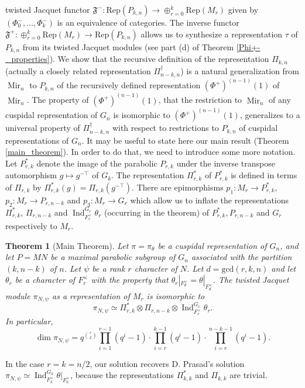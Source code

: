 \documentclass[reqno]{amsart}
\newtheorem*{theorem*}{Theorem}
\theoremstyle{definition}
\theoremstyle{remark}
\numberwithin{equation}{section}
\newcommand{\fF}{\mathfrak F}
\DeclareMathOperator{\Ind}{Ind}
\DeclareMathOperator{\Mir}{Mir}
\begin{document}
twisted Jacquet functor $\fF^-: \text{Rep}(P_{k,n}) \to \oplus_{r=0}^k \text{Rep}(M_r)$ given by $(\Phi_0^-, \dots, \Phi_k^-)$ is an equivalence of categories.  The inverse functor $\fF^+ \colon \oplus_{r=0}^k \text{Rep}(M_r) \to \text{Rep}(P_{k,n})$ allows us to 
synthesize a representation $\tau$ of $P_{k,n}$ from its twisted Jacquet modules (see part (d) of Theorem \ref{Phi+-_properties}). We show that 
the recursive definition of the representation $\Pi_{k,n}$ (actually a closely related representation $\Pi_{n-k,n}^\dagger$) is a natural generalization from $\Mir_n$ to $P_{k,n}$ of the recursively defined representation $(\Phi^+)^{(n-1)}(1)$ of $\Mir_n$. The property of $(\Phi^+)^{(n-1)}(1)$, that the restriction to $\Mir_n$ of any cuspidal representation of $G_n$ is isomorphic to
$(\Phi^+)^{(n-1)}(1)$, generalizes to a universal property of $\Pi^\dagger_{n-k, n}$ with respect to restrictions to $P_{k,n}$ of cuspidal representations of $G_n$. It may be useful to state here our main result (Theorem \ref{main_theorem}). In order to do that, we need to introduce some more notation. Let $P^*_{r,k}$ denote the image of the parabolic $P_{r,k}$ under the inverse transpose automorphism $g \mapsto g^{-\top}$ of $G_k$. The representation $\Pi^*_{r,k}$ of $P^*_{r,k}$ is defined in terms of $\Pi_{r,k}$ by $\Pi^*_{r,k}(g)=\Pi_{r,k}(g^{-\top})$. There are epimorphisms $p_1:M_r \to P^*_{r,k}$, $p_2:M_r \to P_{r,n-k}$ and $p_3:M_r \to G_r$ which allow us to inflate the representations $\Pi^*_{r,k}$, $\Pi_{r,n-k}$ and $\Ind_{F_r^\times}^{G_r} \theta_r$ (occurring in the theorem) of  $P^*_{r,k}, P_{r,n-k}$ and $G_r$ respectively to $M_r$. 
\begin{theorem*}[Main Theorem] Let $\pi=\pi_\theta$ be a cuspidal representation of $G_n$, and let $P=MN$ be a maximal parabolic subgroup of $G_{n}$ associated with the partition $(k,n-k)$ of $n$. Let $\psi$ be a rank $r$ character of $N$. Let $d=\text{gcd}(r,k,n)$ and let $\theta_r$ be a character of $F_r^\times$ with the property that $\theta_r|_{F_d^\times} = \theta|_{F_d^\times}$.  The twisted Jacquet module $\pi_{N, \psi}$ as a representation of $M_r$ is isomorphic to 
\[ \pi_{N, \psi} \simeq \Pi^*_{r,k} \otimes \Pi_{r,n-k} \otimes \Ind_{F_r^\times}^{G_r} \theta_r. \] 
In particular,
\[ \dim  \pi_{N,\psi} =
q^{\binom{r}{2}} \prod_{i=1}^{r-1}(q^i-1) \cdot \prod_{i=r}^{k-1}(q^i-1) \cdot \prod_{i=r}^{n-k-1}(q^i-1).\]
\end{theorem*}
In the case $r=k=n/2$, our solution 
recovers D. Prasad's solution $\pi_{N, \psi} \simeq \Ind_{F_k^\times}^{G_k} \theta|_{F_k^\times}$, because 
the representations $\Pi^*_{k,k}$ and $\Pi_{k,k}$ are trivial.
\end{document}
